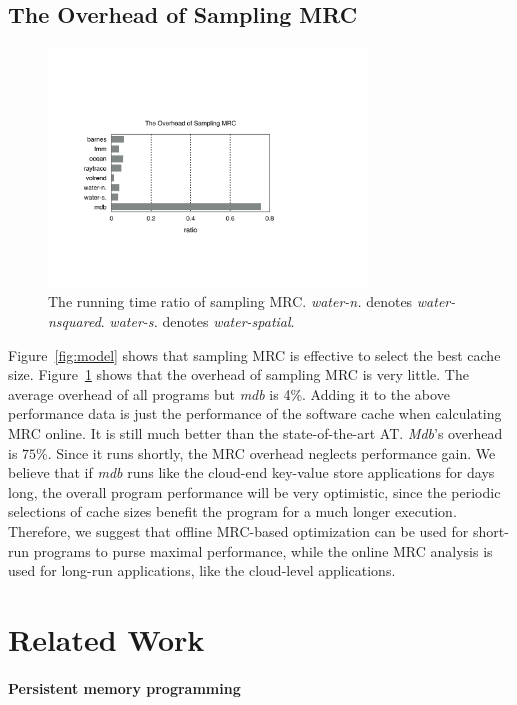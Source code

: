 \documentclass[preprint,nocopyrightspace,10pt]{sigplanconf}
\begin{document}
\subsection{The Overhead of Sampling MRC}
\label{sec:ove}

\begin{figure}[hbpt]
\centering
\includegraphics[width=8.5cm]{figures/mrc_overhead.pdf}
\caption{The running time ratio of sampling MRC. \emph{water-n.} denotes \emph{water-nsquared}.
 \emph{water-s.} denotes \emph{water-spatial}. }
\label{fig:mrc-ove}
\end{figure}

Figure~\ref{fig:model} shows that sampling MRC is effective to select the best
cache size. Figure~\ref{fig:mrc-ove} shows that the overhead of sampling MRC is 
very little. The average overhead of all programs but \emph{mdb} is 4\%. 
Adding it to the above performance data is just the performance of the software 
cache when calculating MRC online. It is still much better than the state-of-the-art AT.
\emph{Mdb}'s overhead is $75\%$. Since it runs shortly, the MRC overhead neglects 
performance gain. We believe that if \emph{mdb} runs like the cloud-end key-value 
store applications for days long, the overall program performance will be very optimistic, 
since the periodic selections of cache sizes benefit the program for a much longer execution. 
Therefore, we suggest that offline MRC-based optimization can be used for short-run 
programs to purse maximal performance, while the online MRC analysis is used for 
long-run applications, like the cloud-level applications.  


\section{Related Work}

\paragraph{Persistent memory programming}
\end{document}
